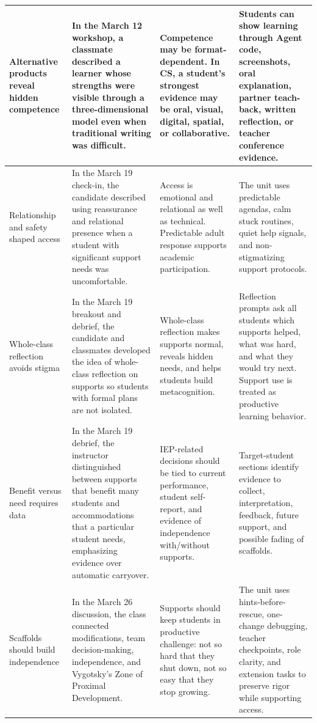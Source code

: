 \documentclass[12pt]{article}
\begin{document}
\begin{xltabular}{\textwidth}{|P{1.45in}|P{1.9in}|P{1.85in}|L|}
\hline
Alternative products reveal hidden competence & In the March 12 workshop, a classmate described a learner whose strengths were visible through a three-dimensional model even when traditional writing was difficult. & Competence may be format-dependent. In CS, a student's strongest evidence may be oral, visual, digital, spatial, or collaborative. & Students can show learning through Agent code, screenshots, oral explanation, partner teach-back, written reflection, or teacher conference evidence. \\
\hline
{} Relationship and safety shaped access & In the March 19 check-in, the candidate described using reassurance and relational presence when a student with significant support needs was uncomfortable. & Access is emotional and relational as well as technical. Predictable adult response supports academic participation. & The unit uses predictable agendas, calm stuck routines, quiet help signals, and non-stigmatizing support protocols. \\
\hline
Whole-class reflection avoids stigma & In the March 19 breakout and debrief, the candidate and classmates developed the idea of whole-class reflection on supports so students with formal plans are not isolated. & Whole-class reflection makes supports normal, reveals hidden needs, and helps students build metacognition. & Reflection prompts ask all students which supports helped, what was hard, and what they would try next. Support use is treated as productive learning behavior. \\
\hline
{} Benefit versus need requires data & In the March 19 debrief, the instructor distinguished between supports that benefit many students and accommodations that a particular student needs, emphasizing evidence over automatic carryover. & IEP-related decisions should be tied to current performance, student self-report, and evidence of independence with/without supports. & Target-student sections identify evidence to collect, interpretation, feedback, future support, and possible fading of scaffolds. \\
\hline
Scaffolds should build independence & In the March 26 discussion, the class connected modifications, team decision-making, independence, and Vygotsky's Zone of Proximal Development. & Supports should keep students in productive challenge: not so hard that they shut down, not so easy that they stop growing. & The unit uses hints-before-rescue, one-change debugging, teacher checkpoints, role clarity, and extension tasks to preserve rigor while supporting access. \\
\hline
\end{xltabular}
\end{document}
